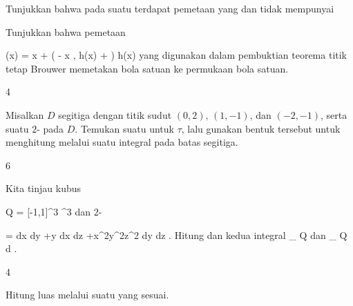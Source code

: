 {}
{

Tunjukkan bahwa pada suatu
terdapat pemetaan
 yang
dan tidak mempunyai

}
{} {}

{}
{

Tunjukkan bahwa pemetaan

\mavergleichskettedisp
{\vergleichskette
{ \varphi(x)
}
{ =} { x + \left( - \left\langle  x  , h(x)  \right\rangle + \right) \cdot h(x)
}
{ } {
}
{ } {
}
{ } {
}
}
{}{}{}
 {} {}
yang digunakan dalam pembuktian
teorema titik tetap Brouwer
memetakan bola satuan ke permukaan bola satuan.

}
{} {}


{4}
{

Misalkan $D$ segitiga dengan titik sudut
$(0,2),\, (1,-1)$, dan $(-2,-1)$,
serta
 suatu
$2$- pada $D$. Temukan suatu
 untuk $\tau$, lalu gunakan bentuk tersebut untuk menghitung
 melalui suatu integral pada batas segitiga.

}
{} {}

{6}
{

Kita tinjau kubus

\mavergleichskettedisp
{\vergleichskette
{ Q
}
{ =} { [-1,1]^3
}
{ \subseteq} { \R^3
}
{ } {
}
{ } {
}
}
{}{}{}
dan
$2$-

\mavergleichskettedisp
{\vergleichskette
{ \omega
}
{ =} { dx \wedge dy +y dx \wedge dz +x^2y^2z^2 dy \wedge dz
}
{ } {
}
{ } {
}
{ } {
}
}
{}{}{.}
Hitung
 dan kedua integral
\mathkor {} {\int_{  \partial Q  }   \omega} {dan} {\int_{  Q  }  d \omega} {}
 {} {.}

}
{} {}

{4}
{

Hitung luas
melalui suatu
yang sesuai.

}
{} {}

